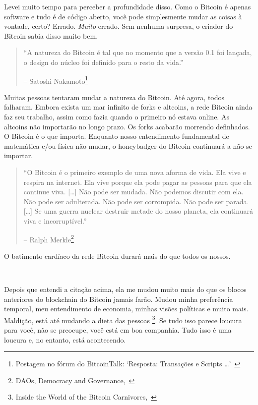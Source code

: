 Levei muito tempo para perceber a profundidade disso. Como o Bitcoin é apenas software e tudo é de código aberto, você pode simplesmente mudar as coisas à vontade, certo? Errado. \textit {Muito} errado. Sem nenhuma surpresa, o criador do Bitcoin sabia disso muito bem.

\begin{quotation}\begin{samepage}
\enquote{A natureza do Bitcoin é tal que no momento que a versão 0.1 foi lançada, o design do núcleo foi definido para o resto da vida.}
\begin{flushright} -- Satoshi Nakamoto\footnote{Postagem no fórum do BitcoinTalk: `Resposta: Transações e Scripts \ldots'~\cite{satoshi-set-in-stone}}
\end{flushright}\end{samepage}\end{quotation}

Muitas pessoas tentaram mudar a natureza do Bitcoin. Até agora, todos falharam. Embora exista um mar infinito de forks e altcoins, a rede Bitcoin ainda faz seu trabalho, assim como fazia quando o primeiro nó estava online. As altcoins não importarão no longo prazo. Os forks acabarão morrendo definhados. O Bitcoin é o que importa. Enquanto nosso entendimento fundamental de matemática e/ou física não mudar, o honeybadger do Bitcoin continuará a não se importar.


\begin{quotation}\begin{samepage}
\enquote{O Bitcoin é o primeiro exemplo de uma nova aforma de vida. Ela vive e respira na internet. Ela vive porque ela pode pagar as pessoas para que ela continue viva. [\ldots] Não pode ser mudada. Não podemos discutir com ela. Não pode ser adulterada. Não pode ser corrompida. Não pode ser parada. [\ldots] Se uma guerra nuclear destruir metade do nosso planeta, ela continuará viva e incorruptível.}
\begin{flushright} -- Ralph Merkle\footnote{DAOs, Democracy and
Governance,~\cite{merkle-dao}}
\end{flushright}\end{samepage}\end{quotation}

O batimento cardíaco da rede Bitcoin durará mais do que todos os nossos.

~

Depois que entendi a citação acima, ela me mudou muito mais do que os blocos anteriores do blockchain do Bitcoin jamais farão. Mudou minha preferência temporal, meu entendimento de economia, minhas visões políticas e muito mais. Maldição, está até mudando a dieta das pessoas \footnote{Inside the World of the Bitcoin
Carnivores,~\cite{carnivores}}. Se tudo isso parece loucura para você, não se preocupe, você está em boa companhia. Tudo isso é uma loucura e, no entanto, está acontecendo.

